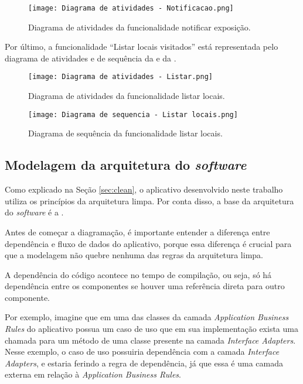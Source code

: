 \begin{figure}[!htb]
  \centering
  \texttt{[image: Diagrama de atividades - Notificacao.png]}
  \caption{Diagrama de atividades da funcionalidade notificar exposição.}
  \label{fig:atividadenotificar}
\end{figure}

Por último, a funcionalidade “Listar locais visitados” está representada pelo diagrama de atividades e de sequência da  e da .

\begin{figure}[!htb]
  \centering
  \texttt{[image: Diagrama de atividades - Listar.png]}
  \caption{Diagrama de atividades da funcionalidade listar locais.}
  \label{fig:atividadelistar}
\end{figure}

\begin{figure}[!htb]
  \centering
  \texttt{[image: Diagrama de sequencia - Listar locais.png]}
  \caption{Diagrama de sequência da funcionalidade listar locais.}
  \label{fig:sequencialistar}
\end{figure}

\subsection{Modelagem da arquitetura do \textit{software}}
Como explicado na Seção \ref{sec:clean}, o aplicativo desenvolvido neste trabalho utiliza os princípios da arquitetura limpa. Por conta disso, a base da arquitetura do \textit{software} é a .

Antes de começar a diagramação, é importante entender a diferença entre dependência e fluxo de dados do aplicativo, porque essa diferença é crucial para que a modelagem não quebre nenhuma das regras da arquitetura limpa.

A dependência do código acontece no tempo de compilação, ou seja, só há dependência entre os componentes se houver uma referência direta para outro componente.

Por exemplo, imagine que em uma das classes da camada \textit{Application Business Rules} do aplicativo possua um caso de uso que em sua implementação exista uma chamada para um método de uma classe presente na camada \textit{Interface Adapters}. Nesse exemplo, o caso de uso possuiria dependência com a camada \textit{Interface Adapters}, e estaria ferindo a regra de dependência, já que essa é uma camada externa em relação à \textit{Application Business Rules}.

